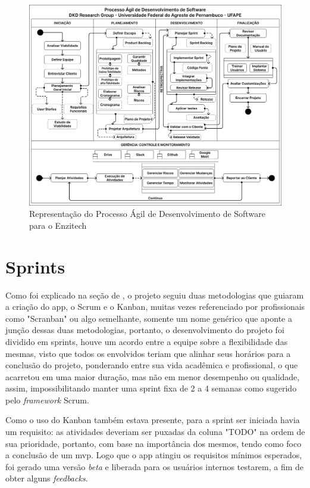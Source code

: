 \begin{figure}[H]
\centering
  \includegraphics[width=\columnwidth]{images/processo_agil.png}
  \caption{Representação do Processo Ágil de Desenvolvimento de Software para o Enzitech}
  \label{fig:processo_agil}
\end{figure}

\section{Sprints}\label{sec:sprint}
Como foi explicado na seção de , o projeto seguiu duas metodologias que guiaram a criação do \ac{app}, o Scrum e o Kanban, muitas vezes referenciado por profissionais como "Scranban" ou algo semelhante, somente um nome genérico que aponte a junção dessas duas metodologias, portanto, o desenvolvimento do projeto foi dividido em sprints, houve um acordo entre a equipe sobre a flexibilidade das mesmas, visto que todos os envolvidos teriam que alinhar seus horários para a conclusão do projeto, ponderando entre sua vida acadêmica e profissional, o que acarretou em uma maior duração, mas não em menor desempenho ou qualidade, assim, impossibilitando manter uma sprint fixa de 2 a 4 semanas como sugerido pelo \textit{framework} Scrum. 

Como o uso do Kanban também estava presente, para a sprint ser iniciada havia um requisito: as atividades deveriam ser puxadas da coluna "TODO" na ordem de sua prioridade, portanto, com base na importância dos mesmos, tendo como foco a conclusão de um \ac{mvp}. Logo que o \ac{app} atingiu os requisitos mínimos esperados, foi gerado uma versão \textit{beta} e liberada para os usuários internos testarem, a fim de obter alguns \textit{feedbacks}.

